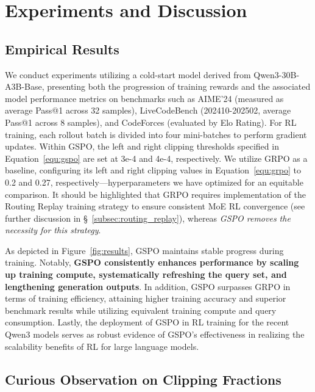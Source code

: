 \section{Experiments and Discussion}

\subsection{Empirical Results}

We conduct experiments utilizing a cold-start model derived from Qwen3-30B-A3B-Base, presenting both the progression of training rewards and the associated model performance metrics on benchmarks such as AIME'24 (measured as average Pass@1 across 32 samples), LiveCodeBench (202410-202502, average Pass@1 across 8 samples), and CodeForces (evaluated by Elo Rating). For RL training, each rollout batch is divided into four mini-batches to perform gradient updates. Within GSPO, the left and right clipping thresholds specified in Equation~\eqref{equ:gspo} are set at 3e-4 and 4e-4, respectively. We utilize GRPO as a baseline, configuring its left and right clipping values in Equation~\eqref{equ:grpo} to 0.2 and 0.27, respectively—hyperparameters we have optimized for an equitable comparison. It should be highlighted that GRPO requires implementation of the Routing Replay training strategy to ensure consistent MoE RL convergence (see further discussion in \S~\ref{subsec:routing_replay}), whereas \textit{GSPO removes the necessity for this strategy}.

As depicted in Figure~\ref{fig:results}, GSPO maintains stable progress during training. Notably, \textbf{GSPO consistently enhances performance by scaling up training compute, systematically refreshing the query set, and lengthening generation outputs}. In addition, GSPO surpasses GRPO in terms of training efficiency, attaining higher training accuracy and superior benchmark results while utilizing equivalent training compute and query consumption. Lastly, the deployment of GSPO in RL training for the recent Qwen3 models serves as robust evidence of GSPO’s effectiveness in realizing the scalability benefits of RL for large language models.

\subsection{Curious Observation on Clipping Fractions}

